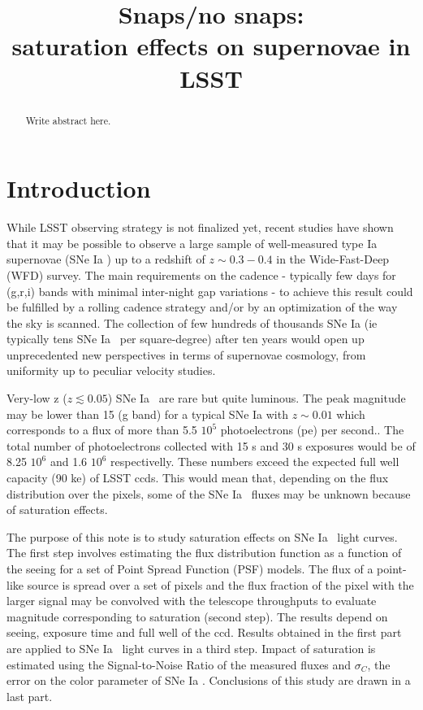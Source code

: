 \documentclass[\docopts]{\docclass}
\newcommand{\sne}{{SNe Ia }}
\newcommand{\pe}{{pe}}
\begin{document}
\title{Snaps/no snaps: \\ saturation effects on supernovae in LSST}

\maketitlepre

\begin{abstract}

  Write abstract here.

\end{abstract}

\dockeys{}

\maketitlepost


\section{Introduction}
\label{sec:intro}
While LSST observing strategy is not finalized yet, recent studies \cite{2018arXiv181200515L} have shown that it may be possible to observe a large sample of well-measured type Ia supernovae (\sne) up to a redshift of $z\sim 0.3-0.4$ in the Wide-Fast-Deep (WFD) survey. The main requirements on the cadence - typically few days for (g,r,i) bands with minimal inter-night gap variations - to achieve this result could be fulfilled by a rolling cadence strategy and/or by an optimization of the way the sky is scanned. The collection of few hundreds of thousands \sne (ie typically tens \sne~per square-degree) after ten years would open up unprecedented new perspectives in terms of supernovae cosmology, from uniformity up to peculiar velocity studies.\par
Very-low z ($z \lesssim 0.05$) \sne~are rare but quite luminous. The peak magnitude may be lower than 15 (g band) for a typical \sne with $z\sim 0.01$ which corresponds to a flux of more than 5.5 $10^5$ photoelectrons (\pe) per second.. The total number of photoelectrons collected with 15 s and 30 s exposures would be of 8.25 $ 10^{6}$ and 1.6 $ 10^{6}$ respectivelly.  These numbers exceed the expected full well capacity (90 ke) of LSST ccds. This would mean that, depending on the flux distribution over the pixels, some of the \sne~fluxes may be unknown because of saturation effects. \par
The purpose of this note is to study saturation effects on \sne~light curves. The first step involves estimating the flux distribution function as a function of the seeing for a set of Point Spread Function (PSF) models. The flux of a point-like source is spread over a set of pixels and the flux fraction of the pixel with the larger signal may be convolved with the telescope throughputs to evaluate magnitude corresponding to saturation (second step). The results depend on seeing, exposure time and full well of the ccd. Results obtained in the first part are applied to \sne~light curves in a third step. Impact of saturation is estimated using the Signal-to-Noise Ratio of the measured fluxes and $\sigma_C$, the error on the color parameter of \sne. Conclusions of this study are drawn in a last part. 
\end{document}
